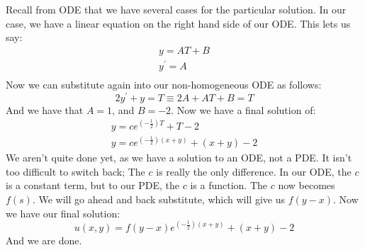 \documentclass{article}
\begin{document}
\noindent Recall from ODE that we have several cases for the particular solution. In our case, we have a linear equation on the right hand side of our ODE. This lets us say:
\begin{gather*}
y = AT + B\\
y^{'} = A\\
\end{gather*}
\noindent Now we can substitute again into our non-homogeneous ODE as follows:
\[
2y^{'} + y = T \equiv 2A + AT + B = T
\]
\noindent And we have that $A = 1$, and $B = -2$. Now we have a final solution of:
\begin{gather*}
y = ce^{\left(-\frac{1}{2}\right)T} + T - 2\\
y = ce^{\left(-\frac{1}{2}\right)(x+y)} + (x + y) - 2
\end{gather*}
\noindent We aren't quite done yet, as we have a solution to an ODE, not a PDE. It isn't too difficult to switch back; The $c$ is really the only difference. In our ODE, the $c$ is a constant term, but to our PDE, the $c$ is a function. The $c$ now becomes $f(s)$. We will go ahead and back substitute, which will give us $f(y-x)$. Now we have our final solution:
\[
u(x,y) = f(y-x)e^{\left(-\frac{1}{2}\right)(x+y)} + (x + y) - 2
\]
\noindent And we are done.


\newpage
\end{document}
